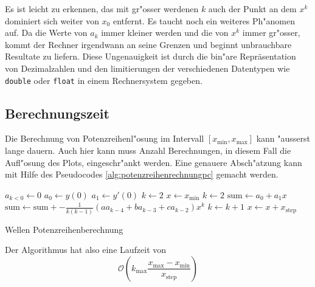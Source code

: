 Es ist leicht zu erkennen, das mit gr"osser werdenen $k$ auch der Punkt an dem 
$x^k$ dominiert sich weiter von $x_0$ entfernt. Es taucht noch ein weiteres 
Ph"anomen auf. Da die Werte von $a_k$ immer kleiner werden und die von $x^k$ 
immer gr"osser, kommt der Rechner irgendwann an seine Grenzen und beginnt 
unbrauchbare Resultate zu liefern. Diese Ungenauigkeit ist durch die bin"are 
Repräsentation von Dezimalzahlen und den limitierungen der verschiedenen 
Datentypen wie \texttt{double} oder \texttt{float} in einem Rechnersystem 
gegeben.

\subsection{Berechnungszeit}
Die Berechnung von Potenzreihenl"osung im Intervall
$[x_{\text{min}},x_{\text{max}}]$ kann "ausserst lange dauern. Auch hier kann
muss Anzahl Berechnungen, in diesem Fall die Aufl"osung des Plots,
eingeschr"ankt werden. Eine genauere Absch"atzung kann mit Hilfe des
Pseudocodes \ref{alg:potenzreihenrechnungpc} gemacht werden.

\begin{algorithm}
	\begin{algorithmic}[1]
		\State $a_{k < 0} \gets 0$
		\State $a_0 \gets y(0)$
		\State $a_1 \gets y'(0)$
		\State $k \gets 2$
		\State $x \gets x_{\text{min}}$
			\State $k \gets 2$
			\State $\text{sum} \gets a_0 + a_1x$
				\State $\text{sum} \gets \text{sum} + -\frac{1}{k(k-1)} 
				(aa_{k-4}+ba_{k-3}+ca_{k-2}) x^k$
				\State $k \gets k + 1$
			\EndFor
			\State $x \gets x + x_{\text{step}}$
		\EndFor
	\end{algorithmic}
	\caption{Wellen Potenzreihenberechnung}\label{alg:potenzreihenrechnungpc}
\end{algorithm}

Der Algorithmus hat also eine Laufzeit von
\begin{equation*}
	\mathcal{O}\left(k_{\text{max}}\frac{x_{\text{max}}-x_{\text{min}}}{x_{\text{step}}}\right)
\end{equation*}
